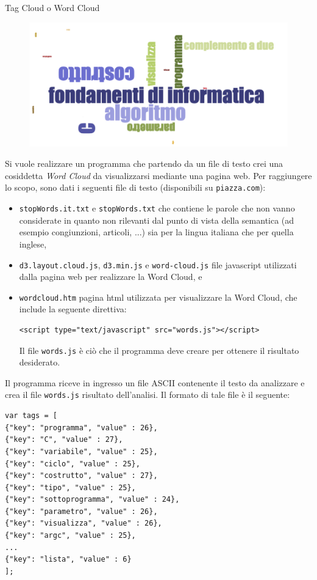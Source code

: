 \begin{labex}{Tag Cloud o Word Cloud}\end{labex}

\begin{figure}
  \begin{center}\vspace{-2em}
    \includegraphics[width=\linewidth]{wcex.png}
  \end{center}%
\end{figure}

Si vuole realizzare un programma che partendo da un file di testo crei una cosiddetta \textit{Word Cloud} da visualizzarsi mediante una pagina web. Per raggiungere lo scopo, sono dati i seguenti file di testo (disponibili su \texttt{piazza.com}):\begin{itemize}
\item \texttt{stopWords.it.txt} e \texttt{stopWords.txt} che contiene le parole che non vanno considerate in quanto non rilevanti dal punto di vista della semantica (ad esempio congiunzioni, articoli, ...) sia per la lingua italiana che per quella inglese,
\item \texttt{d3.layout.cloud.js}, \texttt{d3.min.js} e \texttt{word-cloud.js} file javascript utilizzati dalla pagina web per realizzare la Word Cloud, e
\item \texttt{wordcloud.htm} pagina html utilizzata per visualizzare la Word Cloud, che include la seguente direttiva: 
\begin{verbatim}
<script type="text/javascript" src="words.js"></script>
\end{verbatim}
Il file \texttt{words.js} \`e ci\`o che il programma deve creare per ottenere il risultato desiderato.
\end{itemize}

Il programma riceve in ingresso un file ASCII contenente il testo da analizzare e crea il file \texttt{words.js} risultato dell'analisi. Il formato di tale file \`e il seguente:
\begin{verbatim}
var tags = [
{"key": "programma", "value" : 26},
{"key": "C", "value" : 27},
{"key": "variabile", "value" : 25},
{"key": "ciclo", "value" : 25},
{"key": "costrutto", "value" : 27},
{"key": "tipo", "value" : 25},
{"key": "sottoprogramma", "value" : 24},
{"key": "parametro", "value" : 26},
{"key": "visualizza", "value" : 26},
{"key": "argc", "value" : 25},
...
{"key": "lista", "value" : 6}
];
\end{verbatim}

